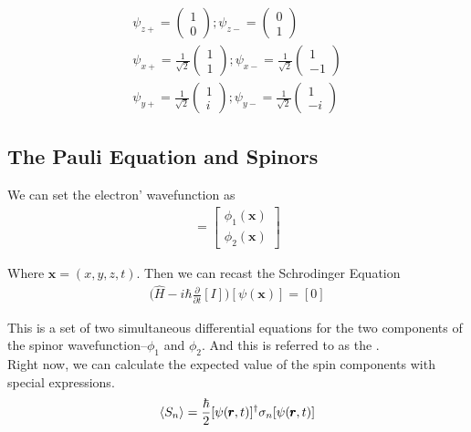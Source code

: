 \begin{gather*}
	\psi_{z+}=\begin{pmatrix}
		1\\0
	\end{pmatrix}; \psi_{z-}=\begin{pmatrix}
		0\\1
	\end{pmatrix}\\
	\psi_{x+}=\frac{1}{\sqrt{2}}\begin{pmatrix}
		1\\1
	\end{pmatrix}; \psi_{x-}=\frac{1}{\sqrt{2}}\begin{pmatrix}
		1\\-1
	\end{pmatrix}\\
	\psi_{y+}=\frac{1}{\sqrt{2}}\begin{pmatrix}
		1\\i
	\end{pmatrix};\psi_{y-}=\frac{1}{\sqrt{2}}\begin{pmatrix}
		1\\-i
	\end{pmatrix}
\end{gather*}


\subsection{The Pauli Equation and Spinors}
\label{sec: pauli equation}

We can set the electron' wavefunction as 
\begin{align}
	[\psi(\pmb{x})]=\begin{bmatrix}
		\phi_1(\pmb{x})\\ \phi_2(\pmb{x})
	\end{bmatrix}	
\end{align}

Where $\pmb{x}=(x,y,z,t)$. Then we can recast the Schrodinger Equation 
\begin{align}
	\Big (\hat{H}-i\hbar \frac{\partial}{\partial t} [I]\Big)[\psi(\pmb{x})]=[0]
	\label{equ: pauli equation}
\end{align}

This is a set of two simultaneous differential equations for the two components of the spinor wavefunction--$\phi_1$ and $\phi_2$. And this is referred to as the .\\ 

Right now, we can calculate the expected value of the spin components with special expressions. 
\begin{gather}
	\braket{S_n}=\frac{\hbar}{2}[\psi(\pmb{r},t)]^\dagger \sigma_n [\psi(\pmb{r},t)]
\end{gather}


